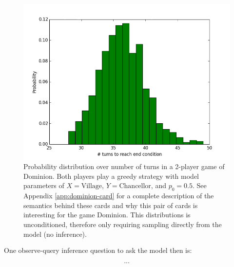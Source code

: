 \begin{figure}
\includegraphics[width=.95\columnwidth]{../pres/village-chancellor-turn-dist.png}
\caption{\label{fig:turn-dist} Probability distribution over number of turns
in a 2-player game of Dominion.
Both players play a greedy strategy with model
parameters of $X = \textrm{Village}$, $Y = \textrm{Chancellor}$, and
$p_0 = 0.5$. See Appendix \ref{app:dominion-card} for a complete description
of the semantics behind these cards and why this pair of cards is interesting
for the game Dominion.
This distributions is unconditioned, therefore only requiring sampling directly
from the model (no inference).
}\end{figure}

One observe-query inference question to ask the model then is:

\begin{equation} \label{eqn-inference-question}
...
\end{equation}

